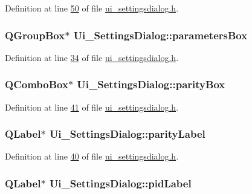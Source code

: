 Definition at line \hyperlink{a00141_source_l00050}{50} of file \hyperlink{a00141_source}{ui\+\_\+settingsdialog.\+h}.

\hypertarget{a00082_a47cebbe70a990bd1f309250101022889}{
\subsubsection[{parameters\+Box}]{\setlength{\rightskip}{0pt plus 5cm}Q\+Group\+Box$\ast$ Ui\+\_\+\+Settings\+Dialog\+::parameters\+Box}}\label{a00082_a47cebbe70a990bd1f309250101022889}


Definition at line \hyperlink{a00141_source_l00034}{34} of file \hyperlink{a00141_source}{ui\+\_\+settingsdialog.\+h}.

\hypertarget{a00082_a88c0b5d1f96a308ab115937b090f7bba}{
\subsubsection[{parity\+Box}]{\setlength{\rightskip}{0pt plus 5cm}Q\+Combo\+Box$\ast$ Ui\+\_\+\+Settings\+Dialog\+::parity\+Box}}\label{a00082_a88c0b5d1f96a308ab115937b090f7bba}


Definition at line \hyperlink{a00141_source_l00041}{41} of file \hyperlink{a00141_source}{ui\+\_\+settingsdialog.\+h}.

\hypertarget{a00082_ae062846ca8db471d7eb362ae39123422}{
\subsubsection[{parity\+Label}]{\setlength{\rightskip}{0pt plus 5cm}Q\+Label$\ast$ Ui\+\_\+\+Settings\+Dialog\+::parity\+Label}}\label{a00082_ae062846ca8db471d7eb362ae39123422}


Definition at line \hyperlink{a00141_source_l00040}{40} of file \hyperlink{a00141_source}{ui\+\_\+settingsdialog.\+h}.

\hypertarget{a00082_a8ad53ddf3a11421d99dfa6fec8c92cfc}{
\subsubsection[{pid\+Label}]{\setlength{\rightskip}{0pt plus 5cm}Q\+Label$\ast$ Ui\+\_\+\+Settings\+Dialog\+::pid\+Label}}\label{a00082_a8ad53ddf3a11421d99dfa6fec8c92cfc}


